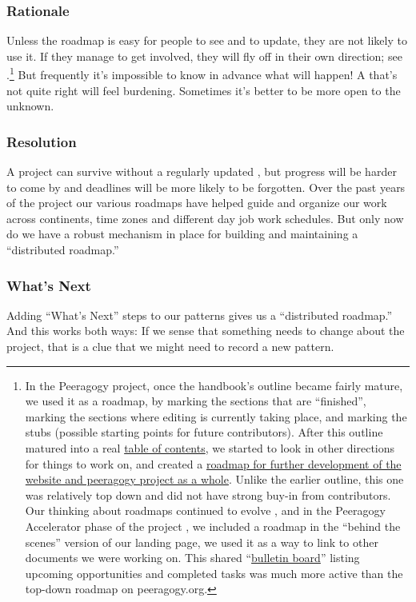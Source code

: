 \subsubsection*{Rationale} Unless the roadmap is easy for people to see and to update, they are not likely to use it.  If they manage to get involved, they will fly off in their own direction; see .\footnote{In the Peeragogy project, once the handbook's outline became fairly mature, we used it as a roadmap, by marking the sections that are ``finished'', marking the sections where editing is currently taking place, and marking the stubs (possible starting points for future contributors). After this outline matured into a real \href{http://peeragogy.org/table-of-contents/}{table of contents}, we started to look in other directions for things to work on, and created a \href{http://peeragogy.org/peeragogy-org-roadmap/}{roadmap for further development of the website and peeragogy project as a whole}.  Unlike the earlier outline, this one was relatively top down and did not have strong buy-in from contributors.  Our thinking about roadmaps continued to evolve \cite{corneli2013roadmaps}, and in the Peeragogy Accelerator phase of the project \cite{building-peeragogy-accelerator}, we included a roadmap in the ``behind the scenes'' version of our landing page, we used it as a way to link to other documents we were working on.  This shared ``\href{https://docs.google.com/document/d/1RZEsqFDwF-jPiCvgWzJgi6n6faTRTDuPQS1CMEeXxRE/edit\#heading=h.p197njr3jsn8}{bulletin board}'' listing upcoming opportunities and completed tasks was much more active than the top-down roadmap on peeragogy.org.}  But frequently it's impossible to know in advance what will happen! A  that's not quite right will feel burdening. Sometimes it's better to be more open to the unknown.

\subsubsection*{Resolution}
A project can survive without a regularly updated , but progress will be harder to come by and deadlines will be more likely to be forgotten.  Over the past years of the project our various roadmaps have helped guide and organize our work across continents, time zones and different day job work schedules.  But only now do we have a robust mechanism in place for building and maintaining a ``distributed roadmap.''

\subsubsection*{What's Next} 
Adding ``What's Next'' steps to our patterns gives us a ``distributed roadmap.''  And this works both ways: If we sense that something needs to change about the project, that is a clue that we might need to record a new pattern.
